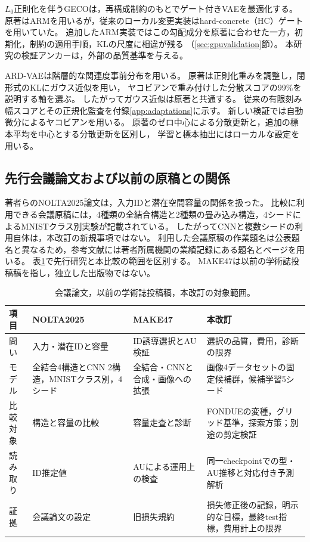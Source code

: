\documentclass[11pt,a4paper]{ltjsarticle}
\begin{document}
$L_0$正則化を伴うGECOは，再構成制約のもとでゲート付きVAEを最適化する\cite{deboom2020geco,rezende2018geco}。
原著はARMを用いるが，従来のローカル変更実装はhard-concrete（HC）ゲートを用いていた\cite{louizos2018l0}。
追加したARM実装ではこの勾配成分を原著に合わせた一方，初期化，制約の適用手順，KLの尺度に相違が残る
（\ref{sec:gpuvalidation}節）。
本研究の検証アンカーは，外部の品質基準を与える。

ARD-VAEは階層的な関連度事前分布を用いる\cite{saha2025ardvae}。
原著は正則化重みを調整し，閉形式のKLにガウス近似を用い，
ヤコビアンで重み付けした分散スコアの99\%を説明する軸を選ぶ。
したがってガウス近似は原著と共通する。
従来の有限刻み幅スコアとその正規化監査を付録\ref{app:adaptations}に示す。
新しい検証では自動微分によるヤコビアンを用いる。
原著のゼロ中心による分散更新と，追加の標本平均を中心とする分散更新を区別し，
学習と標本抽出にはローカルな設定を用いる。

\subsection{先行会議論文および以前の原稿との関係}
著者らのNOLTA2025論文\cite{obata2025manifold}は，入力IDと潜在空間容量の関係を扱った。
比較に利用できる会議原稿には，4種類の全結合構造と2種類の畳み込み構造，4シードによるMNISTクラス別実験が記載されている。
したがってCNNと複数シードの利用自体は，本改訂の新規事項ではない。
利用した会議原稿の作業題名は公表題名と異なるため，参考文献には著者所属機関の業績記録にある題名とページを用いる。
表\ref{tab:history}で先行研究と本比較の範囲を区別する。
MAKE47は以前の学術誌投稿稿を指し，独立した出版物ではない。

\begin{table}[H]
\caption{会議論文，以前の学術誌投稿稿，本改訂の対象範囲。}
\label{tab:history}\small
\begin{tabularx}{\textwidth}{lXXX}\toprule
項目 & NOLTA2025 & MAKE47 & 本改訂 \\\midrule
問い & 入力・潜在IDと容量 & ID誘導選択とAU検証 & 選択の品質，費用，診断の限界 \\
モデル & 全結合4構造とCNN 2構造，MNISTクラス別，4シード & 全結合・CNNと合成・画像への拡張 & 画像4データセットの固定候補群，候補学習5シード \\
比較対象 & 構造と容量の比較 & 容量走査と診断 & FONDUEの変種，グリッド基準，探索方策；別途の剪定検証 \\
読み取り & ID推定値 & AUによる運用上の検査 & 同一checkpointでの型・AU推移と対応付き予測解析 \\
証拠 & 会議論文の設定 & 旧損失規約 & 損失修正後の記録，明示的な目標，最終test指標，費用計上の限界 \\
\bottomrule\end{tabularx}
\end{table}
\end{document}
